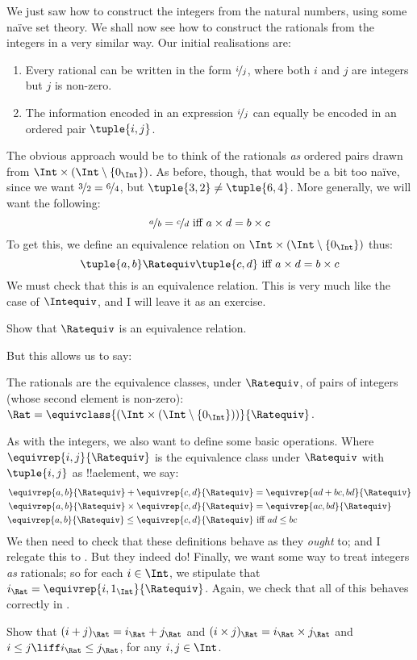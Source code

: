 \documentclass[../../../include/open-logic-section]{subfiles}
\begin{document}
	
\label{s:ArithmetisationZQ}
We just saw how to construct the integers from the natural numbers, using some na\"{i}ve set theory. We shall now see how to construct the rationals from the integers in a very similar way. Our initial realisations are:
	\begin{enumerate}
		\item Every rational can be written in the form $\nicefrac{i}{j}$, where both $i$ and $j$ are integers but $j$ is non-zero.
		\item The information encoded in an expression $\nicefrac{i}{j}$ can equally be encoded in an ordered pair $\tuple{ i, j}$.
	\end{enumerate}
The obvious approach would be to think of the rationals \emph{as} ordered pairs drawn from $\Int \times (\Int \setminus \{0_\Int\})$. As before, though, that would be a bit too na\"ive, since we want $\nicefrac{3}{2} = \nicefrac{6}{4}$, but $\tuple{ 3, 2}\neq \tuple{ 6, 4}$. More generally, we will want the following:
	$$\nicefrac{a}{b} = \nicefrac{c}{d} \text{ iff } a \times d = b \times c$$
To get this, we define an {equivalence relation} on  $\Int \times (\Int \setminus \{0_\Int\})$ thus:
$$\tuple{ a, b }\Ratequiv \tuple{ c, d} \text{ iff }a \times d = b \times c$$  
We must check that this is an equivalence relation. This is very much like the case of $\Intequiv$, and I will leave it as an exercise. 
\begin{prob}Show that $\Ratequiv$ is an equivalence relation.
\end{prob}
But this allows us to say:
	\begin{defn}
		The rationals are the equivalence classes, under $\Ratequiv$, of pairs of integers (whose second element is non-zero):  $\Rat = \equivclass{(\Int \times (\Int\setminus \{0_\Int\}))}{\Ratequiv}$.
	\end{defn}\noindent
As with the integers, we also want to define some basic operations. Where $\equivrep{i,j}{\Ratequiv}$ is the equivalence class under $\Ratequiv$ with $\tuple{ i, j}$ as !!a{element}, we say:
	\begin{align*}
		\equivrep{a, b}{\Ratequiv} + \equivrep{c, d}{\Ratequiv} &= \equivrep{ad + bc,  bd}{\Ratequiv}\\
		\equivrep{a, b}{\Ratequiv} \times \equivrep{c, d}{\Ratequiv} &= \equivrep{a  c, b d}{\Ratequiv}\\
		\equivrep{a, b}{\Ratequiv} \leq \equivrep{c, d}{\Ratequiv} &\text{ iff }ad \leq bc
	\end{align*}
We then need to check that these definitions behave as they \emph{ought} to; and I relegate this to . But they indeed do!{} Finally, we want some way to treat integers \emph{as} rationals; so for each $i \in \Int$, we stipulate that $i_\Rat = \equivrep{i, 1_\Int}{\Ratequiv}$. Again, we check that all of this behaves correctly in .
\begin{prob}
	Show that $(i + j)_\Rat = i_\Rat+ j_\Rat$ and $(i \times j)_\Rat = i_\Rat \times j_\Rat$ and $i \leq j \liff i_\Rat \leq j_\Rat$, for any $i, j \in \Int$.
\end{prob}
\end{document}
